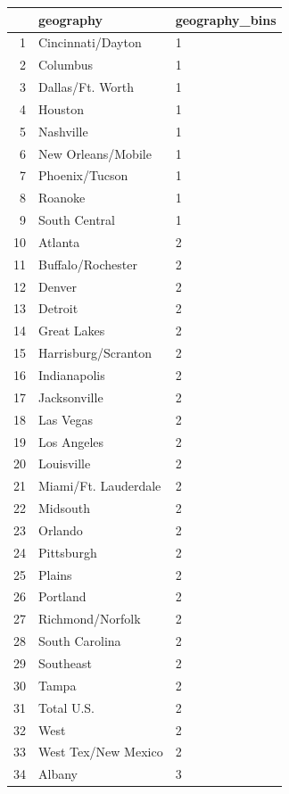 \documentclass[11pt]{article}\usepackage[]{graphicx}\usepackage[]{color}
\begin{document}
\begin{center}
\begin{table}[ht]
\centering
\begin{tabular}{rll}
  \hline
 & geography & geography\_bins \\ 
  \hline
1 & Cincinnati/Dayton & 1 \\ 
  2 & Columbus & 1 \\ 
  3 & Dallas/Ft. Worth & 1 \\ 
  4 & Houston & 1 \\ 
  5 & Nashville & 1 \\ 
  6 & New Orleans/Mobile & 1 \\ 
  7 & Phoenix/Tucson & 1 \\ 
  8 & Roanoke & 1 \\ 
  9 & South Central & 1 \\ 
  10 & Atlanta & 2 \\ 
  11 & Buffalo/Rochester & 2 \\ 
  12 & Denver & 2 \\ 
  13 & Detroit & 2 \\ 
  14 & Great Lakes & 2 \\ 
  15 & Harrisburg/Scranton & 2 \\ 
  16 & Indianapolis & 2 \\ 
  17 & Jacksonville & 2 \\ 
  18 & Las Vegas & 2 \\ 
  19 & Los Angeles & 2 \\ 
  20 & Louisville & 2 \\ 
  21 & Miami/Ft. Lauderdale & 2 \\ 
  22 & Midsouth & 2 \\ 
  23 & Orlando & 2 \\ 
  24 & Pittsburgh & 2 \\ 
  25 & Plains & 2 \\ 
  26 & Portland & 2 \\ 
  27 & Richmond/Norfolk & 2 \\ 
  28 & South Carolina & 2 \\ 
  29 & Southeast & 2 \\ 
  30 & Tampa & 2 \\ 
  31 & Total U.S. & 2 \\ 
  32 & West & 2 \\ 
  33 & West Tex/New Mexico & 2 \\ 
  34 & Albany & 3 \\ 

\end{tabular}
\end{table}
\end{center}
\end{document}
